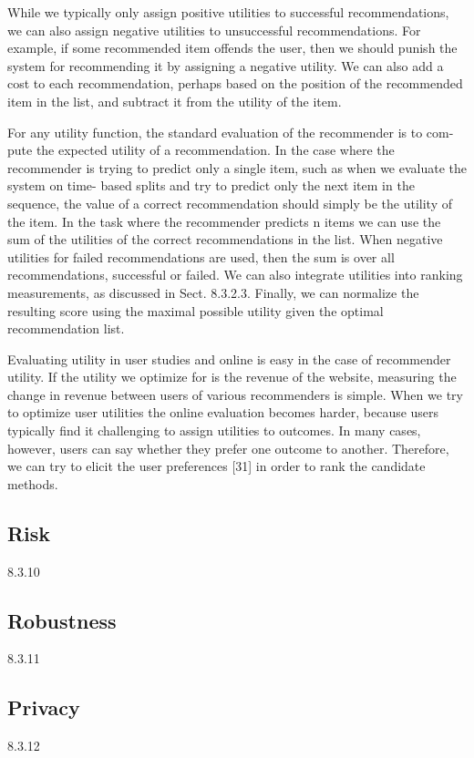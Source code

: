 While we typically only assign positive utilities to successful recommendations, we can also assign negative utilities to unsuccessful recommendations. For example, if some recommended item offends the user, then we should punish the system for recommending it by assigning a negative utility. We can also add a cost to each recommendation, perhaps based on the position of the recommended item in the list, and subtract it from the utility of the item.

For any utility function, the standard evaluation of the recommender is to com- pute the expected utility of a recommendation. In the case where the recommender is trying to predict only a single item, such as when we evaluate the system on time- based splits and try to predict only the next item in the sequence, the value of a correct recommendation should simply be the utility of the item. In the task where the recommender predicts n items we can use the sum of the utilities of the correct recommendations in the list. When negative utilities for failed recommendations are used, then the sum is over all recommendations, successful or failed. We can also integrate utilities into ranking measurements, as discussed in Sect. 8.3.2.3. Finally, we can normalize the resulting score using the maximal possible utility given the optimal recommendation list.

Evaluating utility in user studies and online is easy in the case of recommender utility. If the utility we optimize for is the revenue of the website, measuring the change in revenue between users of various recommenders is simple. When we try to optimize user utilities the online evaluation becomes harder, because users typically find it challenging to assign utilities to outcomes. In many cases, however, users can say whether they prefer one outcome to another. Therefore, we can try to elicit the user preferences [31] in order to rank the candidate methods.

\subsection{Risk}
{8.3.10}

\subsection{Robustness}
{8.3.11}

\subsection{Privacy}
{8.3.12}

